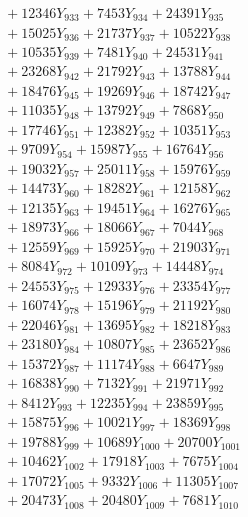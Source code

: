 \documentclass[a4paper,10pt]{article}
\begin{document}
{\begin{align}
&\;  + 12346 Y_{933} + 7453 Y_{934} + 24391 Y_{935} \\[0.3ex]
&\;  + 15025 Y_{936} + 21737 Y_{937} + 10522 Y_{938} \\[0.3ex]
&\;  + 10535 Y_{939} + 7481 Y_{940} + 24531 Y_{941} \\[0.3ex]
&\;  + 23268 Y_{942} + 21792 Y_{943} + 13788 Y_{944} \\[0.3ex]
&\;  + 18476 Y_{945} + 19269 Y_{946} + 18742 Y_{947} \\[0.3ex]
&\;  + 11035 Y_{948} + 13792 Y_{949} + 7868 Y_{950} \\[0.3ex]
&\;  + 17746 Y_{951} + 12382 Y_{952} + 10351 Y_{953} \\[0.3ex]
&\;  + 9709 Y_{954} + 15987 Y_{955} + 16764 Y_{956} \\[0.3ex]
&\;  + 19032 Y_{957} + 25011 Y_{958} + 15976 Y_{959} \\[0.5ex]\allowbreak
&\;  + 14473 Y_{960} + 18282 Y_{961} + 12158 Y_{962} \\[0.3ex]
&\;  + 12135 Y_{963} + 19451 Y_{964} + 16276 Y_{965} \\[0.3ex]
&\;  + 18973 Y_{966} + 18066 Y_{967} + 7044 Y_{968} \\[0.3ex]
&\;  + 12559 Y_{969} + 15925 Y_{970} + 21903 Y_{971} \\[0.3ex]
&\;  + 8084 Y_{972} + 10109 Y_{973} + 14448 Y_{974} \\[0.3ex]
&\;  + 24553 Y_{975} + 12933 Y_{976} + 23354 Y_{977} \\[0.3ex]
&\;  + 16074 Y_{978} + 15196 Y_{979} + 21192 Y_{980} \\[0.3ex]
&\;  + 22046 Y_{981} + 13695 Y_{982} + 18218 Y_{983} \\[0.3ex]
&\;  + 23180 Y_{984} + 10807 Y_{985} + 23652 Y_{986} \\[0.3ex]
&\;  + 15372 Y_{987} + 11174 Y_{988} + 6647 Y_{989} \\[0.5ex]\allowbreak
&\;  + 16838 Y_{990} + 7132 Y_{991} + 21971 Y_{992} \\[0.3ex]
&\;  + 8412 Y_{993} + 12235 Y_{994} + 23859 Y_{995} \\[0.3ex]
&\;  + 15875 Y_{996} + 10021 Y_{997} + 18369 Y_{998} \\[0.3ex]
&\;  + 19788 Y_{999} + 10689 Y_{1000} + 20700 Y_{1001} \\[0.3ex]
&\;  + 10462 Y_{1002} + 17918 Y_{1003} + 7675 Y_{1004} \\[0.3ex]
&\;  + 17072 Y_{1005} + 9332 Y_{1006} + 11305 Y_{1007} \\[0.3ex]
&\;  + 20473 Y_{1008} + 20480 Y_{1009} + 7681 Y_{1010} \\[0.3ex]

\end{align}}
\end{document}
